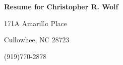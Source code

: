 \documentclass[12pt]{letter}
\begin{document}
    \centerline{\textbf{Resume for Christopher R. Wolf}}
    \centerline{171A Amarillo Place}
    \centerline{Cullowhee, NC 28723}
    \centerline{(919)770-2878}
\end{document}
